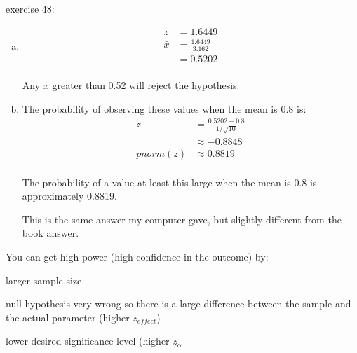 \documentclass[landscape]{exam}
\begin{document}
  exercise 48:

  \begin{enumerate}[(a)]
    \item 
      \begin{align*}
        z       & = 1.6449 \\
        \bar{x} & = \frac{1.6449}{3.162} \\
                & = 0.5202 \\
      \end{align*}

      Any $\bar{x}$ greater than 0.52 will reject the hypothesis.

    \item The probability of observing these values when the mean is 0.8 is:
      \begin{align*}
        z        & = \frac{0.5202 - 0.8}{1/\sqrt{10}} \\
                 & \approx -0.8848 \\
        pnorm(z) & \approx 0.8819 \\
      \end{align*}

      The probability of a value at least this large when the mean is 0.8 is
      approximately 0.8819.

      This is the same answer my computer gave, but slightly different from the
      book answer. 

  \end{enumerate}


  You can get high power (high confidence in the outcome) by:
  \begin{itemize*}
    \item larger sample size
    \item null hypothesis very wrong so there is a large difference between the
      sample and the actual parameter (higher $z_{effect}$)
    \item lower desired significance level (higher $z_{\alpha}$
  \end{itemize*}
\end{document}
